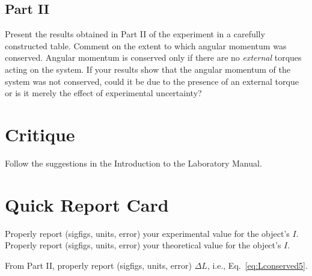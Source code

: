 \subsection*{Part II}
Present the results obtained in Part II of the experiment in a
carefully constructed table.
Comment on the extent to which angular momentum was conserved.
Angular momentum is  conserved only if there are no {\em
external}
torques acting on the system.  If your results show that the angular momentum
of the system was not conserved, could it be due to the presence of an
external torque or is it merely the effect of experimental
uncertainty?


\section*{Critique}
Follow the suggestions in the Introduction to the Laboratory Manual.

\section*{Quick Report Card}
Properly report (sigfigs, units, error) your experimental value for the object's $I$.
Properly report (sigfigs, units, error) your theoretical value for the object's $I$.

From Part II, properly report (sigfigs, units, error) $\Delta L$, i.e., Eq.~\ref{eq:Lconserved5}.